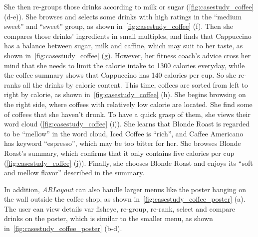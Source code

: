 She then re-groups those drinks according to milk or sugar (\autoref{fig:casestudy_coffee} (d-e)).
She browses and selects some drinks with high ratings in the ``medium sweet''
and ``sweet'' group, as shown in~\autoref{fig:casestudy_coffee} (f).
Then she compares those drinks' ingredients in small multiples,
and finds that Cappuccino has a balance between sugar, milk and caffine,
which may suit to her taste, as shown in~\autoref{fig:casestudy_coffee} (g).
However, her fitness coach's advice cross her mind that she needs to limit the calorie intake to 1300 calories everyday,
while the coffee summary shows that Cappuccino has 140 calories per cup.
So she re-ranks all the drinks by calorie content.
This time, coffees are sorted from left to right by calorie,
as shown in~\autoref{fig:casestudy_coffee} (h).
She begins browsing on the right side, where coffees with relatively low calorie are located.
She find some of coffees that she haven’t drunk.
To have a quick grasp of them, she views their word cloud (\autoref{fig:casestudy_coffee} (i)).
She learns that Blonde Roast is regarded to be ``mellow'' in the word cloud,
Iced Coffee is ``rich'',
and Caffee Americano has keyword ``espresso'', which may be too bitter for her.
She browses Blonde Roast's summary, which confirms that it only contains five calories per cup (\autoref{fig:casestudy_coffee} (j)).
Finally, she chooses Blonde Roast and enjoys its ``soft and mellow flavor'' described in the summary.

In addition, \textit{ARLayout} can also handle larger menus like the poster hanging on the wall
outside the coffee shop, as shown in~\autoref{fig:casestudy_coffee_poster} (a).
The user can view details var fisheye, re-group, re-rank, select and compare drinks on the poster, 
which is similar to the smaller menu, as shown in~\autoref{fig:casestudy_coffee_poster} (b-d).


